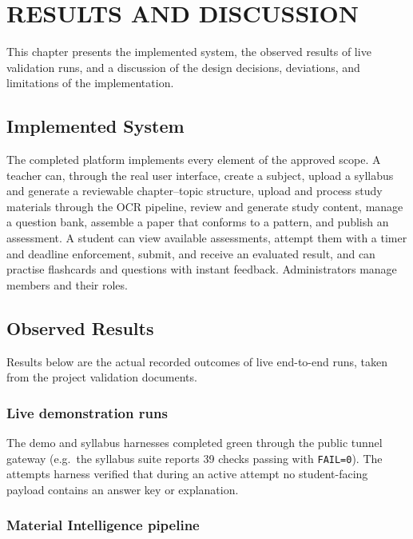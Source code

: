 \chapter{RESULTS AND DISCUSSION}
\thispagestyle{empty}

This chapter presents the implemented system, the observed results of live
validation runs, and a discussion of the design decisions, deviations, and
limitations of the implementation.

\clearpage

\section{Implemented System}

The completed platform implements every element of the approved scope. A
teacher can, through the real user interface, create a subject, upload a
syllabus and generate a reviewable chapter--topic structure, upload and
process study materials through the OCR pipeline, review and generate study
content, manage a question bank, assemble a paper that conforms to a pattern,
and publish an assessment. A student can view available assessments, attempt
them with a timer and deadline enforcement, submit, and receive an evaluated
result, and can practise flashcards and questions with instant feedback.
Administrators manage members and their roles.

\section{Observed Results}

Results below are the actual recorded outcomes of live end-to-end runs, taken
from the project validation documents.

\subsection{Live demonstration runs}

The demo and syllabus harnesses completed green through the public tunnel
gateway (e.g.\ the syllabus suite reports 39 checks passing with
\texttt{FAIL=0}). The attempts harness verified that during an active
attempt no student-facing payload contains an answer key or explanation.

\subsection{Material Intelligence pipeline}


